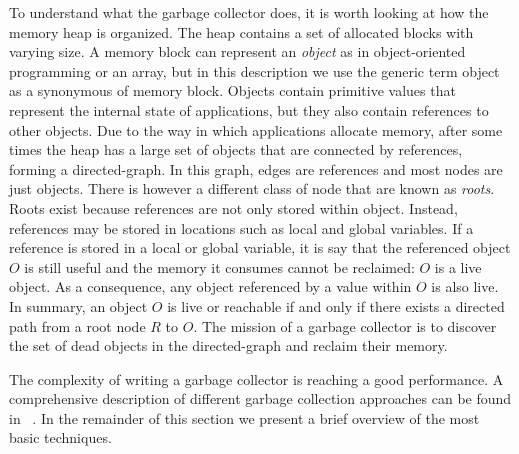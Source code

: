 To understand what the garbage collector does, it is worth looking at how the memory heap is organized.
The heap contains a set of allocated blocks with varying size.
A memory block can represent an \textit{object} as in object-oriented programming or an array, but in this description we use the generic term object as a synonymous of memory block. 
Objects contain primitive values that represent the internal state of applications, but they also contain references to other objects.
Due to the way in which applications allocate memory, after some times the heap has a large set of objects that are connected by references, forming a directed-graph.
In this graph, edges are references and most nodes are just objects.
There is however a different class of node that are known as \textit{roots}.
Roots exist because references are not only stored within object.
Instead, references may be stored in locations such as local and global variables.
If a reference is stored in a local or global variable, it is say that the referenced object $O$ is still useful and the memory it consumes cannot be reclaimed: $O$ is a live object.
As a consequence, any object referenced by a value within $O$ is also live.
In summary, an object $O$ is live or reachable if and only if there exists a directed path from a root node $R$ to $O$.
The mission of a garbage collector is to discover the set of dead objects in the directed-graph and reclaim their memory.

The complexity of writing a garbage collector is reaching a good performance.
A comprehensive description of different garbage collection approaches can be found in ~\cite{Richard2012}.
In the remainder of this section we present a brief overview of the most basic techniques.

